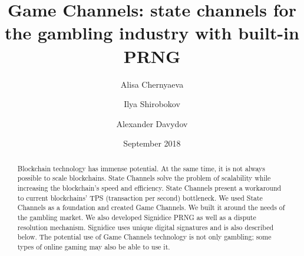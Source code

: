 \documentclass[tikz, 12pt]{article}
\title {Game Channels: state channels for the gambling industry with built-in PRNG}
\author {Alisa Chernyaeva}
\author{Ilya Shirobokov}
\author{Alexander Davydov}
\affil{Research department, DAO.Casino Company}
\affil{ \href{mailto:research@dao.casino}{research@dao.casino}}
\date {September 2018}
\theoremstyle{definition}
\theoremstyle{remark}
\begin{document}
\maketitle
	\begin{abstract}
Blockchain technology has immense potential. At the same time, it is not always possible to scale blockchains. State Channels solve the problem of scalability while increasing the blockchain's speed and efficiency. State Channels present a workaround to current blockchains' TPS (transaction per second) bottleneck. We used State Channels as a foundation and created Game Channels. We built it around the needs of the gambling market. We also developed Signidice PRNG as well as a dispute resolution mechanism. Signidice uses unique digital signatures and is also described below. The potential use of Game Channels technology is not only gambling; some types of online gaming may also be able to use it.

	\end{abstract}
\tableofcontents	
	
	
		
\end{document}
